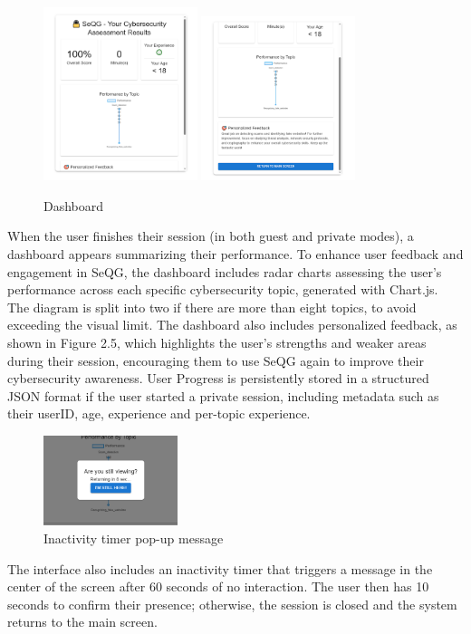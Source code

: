 \begin{figure}[H]
    \centering
    \includegraphics[width=0.4\textwidth]{images/Grading2.png}
    \includegraphics[width=0.4\textwidth]{images/Grading3.png}
    \caption{Dashboard}
\end{figure}
When the user finishes their session (in both guest and private modes), a dashboard appears summarizing their performance. 
To enhance user feedback and engagement in SeQG, the dashboard includes radar charts assessing the user's performance 
across each specific cybersecurity topic, generated with Chart.js. The diagram is split into two if there are more 
than eight topics, to avoid exceeding the visual limit. The dashboard also includes personalized feedback, as 
shown in Figure 2.5, which highlights the user's strengths and weaker areas during their session, encouraging 
them to use SeQG again to improve their cybersecurity awareness. User Progress is persistently stored in a 
structured JSON format if the user started a private session, including metadata such as their userID, age, 
experience and per-topic experience.


\begin{figure}[H]
    \centering
    \includegraphics[width=0.35\textwidth]{images/Grading1.png}
    \caption{Inactivity timer pop-up message}
\end{figure}
The interface also includes an inactivity timer that triggers a message in the center of the screen after 60 seconds 
of no interaction. The user then has 10 seconds to confirm their presence; otherwise, the session is closed and the 
system returns to the main screen.